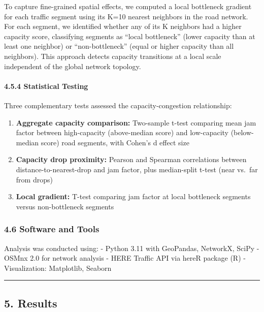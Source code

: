 \documentclass[
  12pt,
]{article}
\providecommand{\tightlist}{%
  \setlength{\itemsep}{0pt}\setlength{\parskip}{0pt}}
\begin{document}
To capture fine-grained spatial effects, we computed a local bottleneck gradient for each traffic segment using its K=10 nearest neighbors in the road network. For each segment, we identified whether any of its K neighbors had a higher capacity score, classifying segments as ``local bottleneck'' (lower capacity than at least one neighbor) or ``non-bottleneck'' (equal or higher capacity than all neighbors). This approach detects capacity transitions at a local scale independent of the global network topology.

\paragraph{4.5.4 Statistical Testing}\label{statistical-testing}

Three complementary tests assessed the capacity-congestion relationship:

\begin{enumerate}
\def\labelenumi{\arabic{enumi}.}
\tightlist
\item
  \textbf{Aggregate capacity comparison:} Two-sample t-test comparing mean jam factor between high-capacity (above-median score) and low-capacity (below-median score) road segments, with Cohen's d effect size
\item
  \textbf{Capacity drop proximity:} Pearson and Spearman correlations between distance-to-nearest-drop and jam factor, plus median-split t-test (near vs.~far from drops)
\item
  \textbf{Local gradient:} T-test comparing jam factor at local bottleneck segments versus non-bottleneck segments
\end{enumerate}

\subsubsection{4.6 Software and Tools}\label{software-and-tools}

Analysis was conducted using: - Python 3.11 with GeoPandas, NetworkX, SciPy - OSMnx 2.0 for network analysis - HERE Traffic API via hereR package (R) - Visualization: Matplotlib, Seaborn

\begin{center}\rule{0.5\linewidth}{0.5pt}\end{center}

\subsection{5. Results}\label{results}
\end{document}
